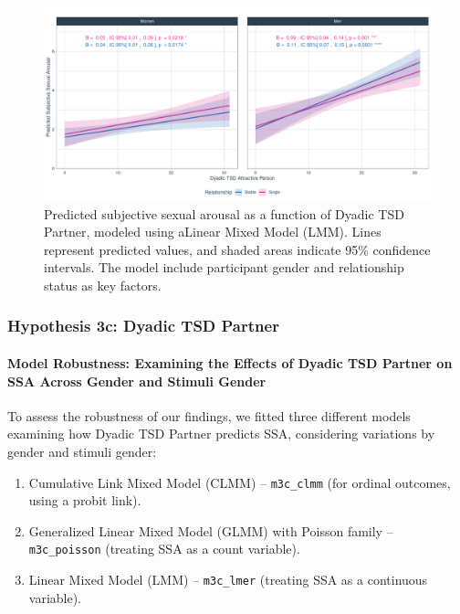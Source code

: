 \documentclass[
  bookmarksnumbered]{article}
\providecommand{\tightlist}{%
  \setlength{\itemsep}{0pt}\setlength{\parskip}{0pt}}
\begin{document}
\begin{figure}
\centering
\includegraphics{Sexual_Desire_Arousal_files/figure-latex/fig-h3b-1.pdf}
\caption{\label{fig:fig-h3b}Predicted subjective sexual arousal as a function of Dyadic TSD Partner, modeled using aLinear Mixed Model (LMM). Lines represent predicted values, and shaded areas indicate 95\% confidence intervals. The model include participant gender and relationship status as key factors.}
\end{figure}

\subsubsection{Hypothesis 3c: Dyadic TSD Partner}\label{hyp3c}

\paragraph{Model Robustness: Examining the Effects of Dyadic TSD Partner on SSA Across Gender and Stimuli Gender}\label{model-robustness-examining-the-effects-of-dyadic-tsd-partner-on-ssa-across-gender-and-stimuli-gender-1}

To assess the robustness of our findings, we fitted three different models examining how Dyadic TSD Partner predicts SSA, considering variations by gender and stimuli gender:

\begin{enumerate}
\def\labelenumi{\arabic{enumi}.}
\tightlist
\item
  Cumulative Link Mixed Model (CLMM) -- \texttt{m3c\_clmm} (for ordinal outcomes, using a probit link).
\item
  Generalized Linear Mixed Model (GLMM) with Poisson family -- \texttt{m3c\_poisson} (treating SSA as a count variable).
\item
  Linear Mixed Model (LMM) -- \texttt{m3c\_lmer} (treating SSA as a continuous variable).
\end{enumerate}
\end{document}

